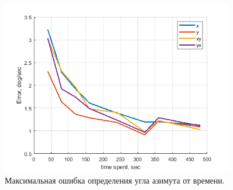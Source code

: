 \documentclass[a4paper,12pt]{article}
\begin{document}
\begin{figure}[h!] 
\centering
\includegraphics[width=0.9\textwidth]{err_max.png} 
\caption{\label{fig:err_max} Максимальная ошибка определения угла азимута от времени.}
\end{figure}

\end{document}
